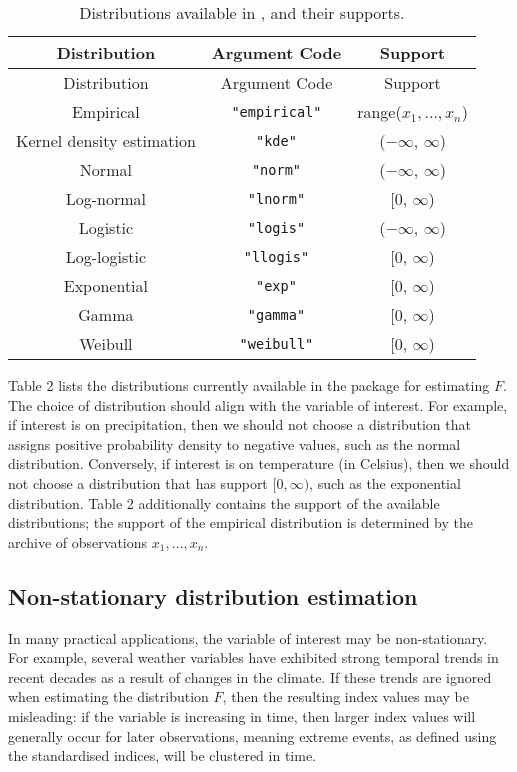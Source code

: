 \begin{longtable}[]{@{}ccc@{}}
\caption{\label{tab:unnamed-chunk-2}Distributions available in , and their supports.}\tabularnewline
\toprule\noalign{}
Distribution & Argument Code & Support \\
\midrule\noalign{}
\endfirsthead
\toprule\noalign{}
Distribution & Argument Code & Support \\
\midrule\noalign{}
\endhead
\bottomrule\noalign{}
\endlastfoot
Empirical & \texttt{"empirical"} & range(\(x_{1}, \dots, x_{n}\)) \\
Kernel density estimation & \texttt{"kde"} & (\(-\infty\), \(\infty\)) \\
Normal & \texttt{"norm"} & (\(-\infty\), \(\infty\)) \\
Log-normal & \texttt{"lnorm"} & {[}\(0\), \(\infty\)) \\
Logistic & \texttt{"logis"} & (\(-\infty\), \(\infty\)) \\
Log-logistic & \texttt{"llogis"} & {[}\(0\), \(\infty\)) \\
Exponential & \texttt{"exp"} & {[}\(0\), \(\infty\)) \\
Gamma & \texttt{"gamma"} & {[}\(0\), \(\infty\)) \\
Weibull & \texttt{"weibull"} & {[}\(0\), \(\infty\)) \\
\end{longtable}

Table 2 lists the distributions currently available in the  package for estimating \(F\). The choice of distribution should align with the variable of interest. For example, if interest is on precipitation, then we should not choose a distribution that assigns positive probability density to negative values, such as the normal distribution. Conversely, if interest is on temperature (in Celsius), then we should not choose a distribution that has support \([0, \infty)\), such as the exponential distribution. Table 2 additionally contains the support of the available distributions; the support of the empirical distribution is determined by the archive of observations \(x_{1}, \dots, x_{n}\).

\subsection{Non-stationary distribution estimation}\label{non-stationary-distribution-estimation}

In many practical applications, the variable of interest may be non-stationary. For example, several weather variables have exhibited strong temporal trends in recent decades as a result of changes in the climate. If these trends are ignored when estimating the distribution \(F\), then the resulting index values may be misleading: if the variable is increasing in time, then larger index values will generally occur for later observations, meaning extreme events, as defined using the standardised indices, will be clustered in time.


